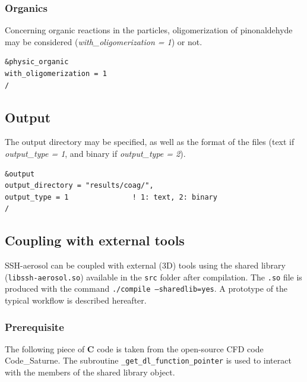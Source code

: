 \documentclass[a4paper,11pt]{article}
\begin{document}
\subsubsection{Organics}

Concerning organic reactions in the particles, oligomerization of pinonaldehyde may be considered ({\textit{with\_oligomerization = 1}}) or not.


\begin{verbatim}
&physic_organic
with_oligomerization = 1      
/
\end{verbatim}


\subsection{Output}

The output directory may be specified, as well as the format of the files (text if {\textit{output\_type = 1}}, and binary if {\textit{output\_type = 2}}).
 
\begin{verbatim}
&output
output_directory = "results/coag/", 
output_type = 1               ! 1: text, 2: binary
/
\end{verbatim}

\subsection{Coupling with external tools}

SSH-aerosol can be coupled with external (3D) tools using the shared library (\texttt{libssh-aerosol.so}) available in the \texttt{src} folder after compilation.
The \texttt{.so} file is produced with the command \texttt{./compile --sharedlib=yes}.
A prototype of the typical workflow is described hereafter.

\subsubsection*{Prerequisite}

The following piece of \textbf{C} code is taken from the open-source CFD code Code\_Saturne.
The subroutine \texttt{\_get\_dl\_function\_pointer} is used to interact with the members of the shared library object.
\end{document}
